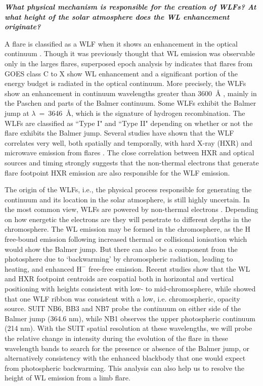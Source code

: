 \documentclass{article}
\begin{document}
\textit{\textbf{What physical mechanism is responsible for the creation of WLFs? At what height of the solar atmosphere does the WL enhancement originate?}}

\vspace{0.2in}
A flare is classified as a WLF when it shows an enhancement in the optical continuum \citep{svestka66, neidig93}. Though it was previously thought that WL emission was observable only in the larges flares, superposed epoch analysis by \cite{kretzschmar11} indicates that flares from GOES class C to X show WL enhancement and a significant portion of the energy budget is radiated in the optical continuum. More precisely, the WLFs show an enhancement in continuum wavelengths greater than 3600~{\AA} \citep{machado89}, mainly in the Paschen and parts of the Balmer continuum. Some WLFs exhibit the Balmer jump at $\lambda$~=~3646~{\AA}, which is the signature of hydrogen recombination. The WLFs are classified as ``Type I" and ``Type II" \citep{machado89} depending on whether or not the flare exhibits the Balmer jump. Several studies have shown that the WLF correlates very well, both spatially and temporally, with hard X-ray (HXR) and microwave emission from flares \citep{fletcher07, watanabe10, krucker11, kerr14}. The close correlation between HXR and optical sources and timing strongly suggests that the non-thermal electrons that generate flare footpoint HXR emission are also responsible for the WLF emission.

The origin of the WLFs, i.e., the physical process responsible for generating the continuum and its location in the solar atmosphere, is still highly uncertain. In the most common view, WLFs are powered by non-thermal electrons \citep[though models involving dissipation of Alfv\'en waves have also been proposed][]{1982SoPh...80...99E,2013ApJ...765...81R}. Depending on how energetic the electrons are they will penetrate to different depths in the chromosphere. The WL emission may be formed in the chromosphere, as the H free-bound emission following increased thermal or collisional ionisation which would show the Balmer jump. But there can also be a component from the photosphere due to `backwarming' by chromospheric radiation, leading to heating, and enhanced $\mathrm{H}^{-}$ free-free emission. Recent studies show that the WL and HXR footpoint centroids are cospatial both in horizontal and vertical positioning \cite{2006SoPh..234...79H,oliveros12,krucker15} with heights consistent with low- to mid-chromosphere, while \cite{2010ApJ...722.1514P} showed that one WLF ribbon was consistent with a low, i.e. chromospheric, opacity source. SUIT NB6, BB3 and NB7 probe the continuum on either side of the Balmer jump (364.6 nm), while NB1 observes the upper photospheric continuum (214 nm). With the SUIT spatial resolution at these wavelengths, we will probe the relative change in intensity during the evolution of the flare in these wavelength bands to search for the presence or absence of the Balmer jump, or alternatively consistency with the enhanced blackbody that one would expect from photospheric backwarming. This analysis can also help us to resolve the height of WL emission from a limb flare.  
\end{document}
